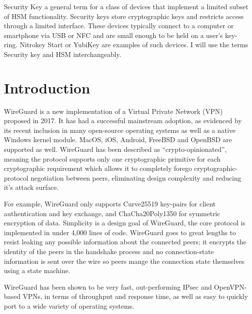 \documentclass [11pt, proquest] {uwthesis}[2020/02/24]
\begin{document}
\begin{glossary}
\item[Security Key]
a general term for a class of devices that implement a limited subset of HSM functionality. Security keys store cryptographic keys and restricts access through a limited interface. These devices typically connect to a computer or smartphone via USB or NFC and are small enough to be held on a user's key-ring.
Nitrokey Start\cite{noauthor_nitrokey_nodate} or YubiKey\cite{noauthor_discover_nodate}\cite{noauthor_u2f_nodate-1} are examples of such devices. 
I will use the terms Security key and HSM interchangeably.

\end{glossary}

\textpages

\chapter {Introduction} \label{introduction}

WireGuard is a new implementation of a Virtual Private Network (VPN) proposed in 2017. It has had a successful mainstream adoption, as evidenced by its recent inclusion in many open-source operating systems\cite{donenfeld_wireguard_nodate} as well as a native Windows kernel module\cite{noauthor_wireguard-nt_nodate}. MacOS, iOS, Android, FreeBSD and OpenBSD are supported as well.
WireGuard has been described as “crypto-opinionated”, meaning the protocol supports only one cryptographic primitive for each cryptographic requirement which allows it to completely forego cryptographic-protocol negotiation between peers, eliminating design complexity and reducing it's attack surface. 

For example, WireGuard only supports Curve25519 key-pairs for client authentication and key exchange, and ChaCha20Poly1350 for symmetric encryption\cite{donenfeld_wireguard_2017} of data.
Simplicity is a design goal of WireGuard, the core protocol is implemented in under 4,000 lines of code. WireGuard goes to great lengths to resist leaking any possible information about the connected peers; it encrypts the identity of the peers in the handshake process and no connection-state information is sent over the wire so peers mange the connection state themselves using a state machine. 

WireGuard has been shown to be very fast, out-performing IPsec and OpenVPN-based VPNs, in terms of throughput and response time\cite{donenfeld_performance_2018}, as well as easy to quickly port to a wide variety of operating systems. 
\end{document}
